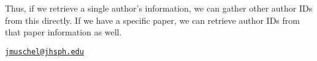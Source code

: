 Thus, if we retrieve a single author's information, we can gather other
author IDs from this directly. If we have a specific paper, we can
retrieve author IDs from that paper information as well.


\address{%
John Muschelli\\
Department of Biostatistics, Johns Hopkins Bloomberg School of Public
Health\\
615 N Wolfe St Baltimore, MD 21205\\
}
\href{mailto:jmuschel@jhsph.edu}{\nolinkurl{jmuschel@jhsph.edu}}

